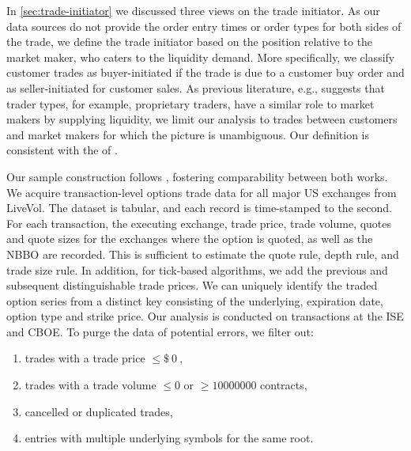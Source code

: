 In \cref{sec:trade-initiator} we discussed three views on the trade initiator. As our data sources do not provide the order entry times or order types for both sides of the trade, we define the trade initiator based on the position relative to the market maker, who caters to the liquidity demand. More specifically, we classify customer trades as buyer-initiated if the trade is due to a customer buy order and as seller-initiated for customer sales. As previous literature, e.g., \textcite[][4276]{garleanuDemandBasedOptionPricing2009} suggests that trader types, for example, proprietary traders, have a similar role to market makers by supplying liquidity, we limit our analysis to trades between customers and market makers for which the picture is unambiguous. Our definition is consistent with the of \textcite[][8]{grauerOptionTradeClassification2022}.


Our sample construction follows \textcite[][7--9]{grauerOptionTradeClassification2022}, fostering comparability between both works. We acquire transaction-level options trade data for all major US exchanges from LiveVol. The dataset is tabular, and each record is time-stamped to the second. For each transaction, the executing exchange, trade price, trade volume, quotes and quote sizes for the exchanges where the option is quoted, as well as the \gls{NBBO} are recorded. This is sufficient to estimate the quote rule, depth rule, and trade size rule. In addition, for tick-based algorithms, we add the previous and subsequent distinguishable trade prices. We can uniquely identify the traded option series from a distinct key consisting of the underlying, expiration date, option type and strike price. Our analysis is conducted on transactions at the \gls{ISE} and \gls{CBOE}. To purge the data of potential errors, we filter out:
\begin{enumerate}[label=(\roman*),noitemsep]
    \item trades with a trade price $\leq \SI{0}[\$]{}$,
    \item trades with a trade volume $\leq 0$ or $\ge \num{10000000}$ contracts,
    \item cancelled or duplicated trades,
    \item entries with multiple underlying symbols for the same root.
\end{enumerate}


